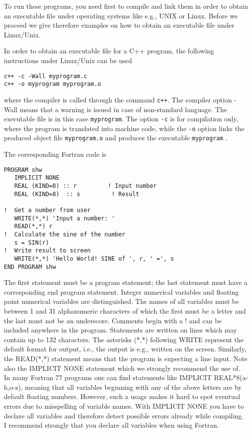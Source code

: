 To run these programs, you need first to compile and link
them in order to obtain an executable file under operating systems like  e.g., 
UNIX or Linux. 
Before we proceed we give therefore examples on how to obtain an
executable file under Linux/Unix. 

In order to obtain an executable file for a C++ program, the following 
instructions under Linux/Unix can be used
\begin{tcolorbox}
\begin{verbatim}
c++ -c -Wall myprogram.c
c++ -o myprogram myprogram.o
\end{verbatim}
\end{tcolorbox}
where the compiler is called through the command \verb$c++$. The compiler
option -Wall means that a warning is issued in case of non-standard
language. The executable file is in this case \verb$myprogram$. The option
\verb$-c$ is for compilation only, where the program is translated into machine code,
while the \verb$-o$ option links the produced object file \verb$myprogram.o$ 
and produces the executable \verb$myprogram$ .

The corresponding Fortran  code is 
\lstset{language=[90]Fortran}
\begin{lstlisting}[title={\href{{https://github.com/CompPhysics/CompPhysBook1/tree/master/doc/Programs/Chapter2/fortran/program1.f90}}{Click here to view code}}]
PROGRAM shw
   IMPLICIT NONE
   REAL (KIND=8) :: r         ! Input number
   REAL (KIND=8)  :: s         ! Result

!  Get a number from user
   WRITE(*,*) 'Input a number: '
   READ(*,*) r
!  Calculate the sine of the number
   s = SIN(r)
!  Write result to screen
   WRITE(*,*) 'Hello World! SINE of ', r, ' =', s
END PROGRAM shw
\end{lstlisting}
 The first statement must be a program statement; the last statement must have a
corresponding end program statement. 
Integer numerical variables and floating point numerical variables are distinguished. The
names of all variables must be between 1 and 31 alphanumeric characters of which the first
must be a letter and the last must not be an underscore. 
Comments begin with a ! and can be included anywhere in the program. 
Statements are written on lines which may contain up to 132 characters. 
The asterisks (*,*) following WRITE represent 
the default format for output, i.e., the output is e.g., 
written on the screen. Similarly, the READ(*,*) statement means
that the program is expecting a line input.
Note also the IMPLICIT NONE statement which we 
strongly recommend the use of. In many Fortran 77 programs one can  find
statements like IMPLICIT REAL*8(a-h,o-z), meaning
that all variables beginning with any of the above 
letters are by default floating numbers. However,
such a usage makes it hard to spot eventual errors
due to misspelling of variable names. With IMPLICIT NONE
you have to declare all variables and therefore detect
possible errors already while compiling. I recommend strongly that you declare all variables
when using Fortran.

